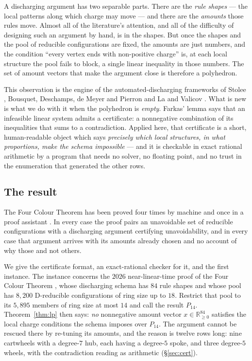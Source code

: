 \documentclass[11pt]{article}
\theoremstyle{definition}
\begin{document}
A discharging argument has two separable parts. There are the \emph{rule shapes}
--- the local patterns along which charge may move --- and there are the
\emph{amounts} those rules move. Almost all of the literature's attention, and
all of the difficulty of designing such an argument by hand, is in the shapes.
But once the shapes and the pool of reducible configurations are fixed, the
amounts are just numbers, and the condition ``every vertex ends with non-positive
charge'' is, at each local structure the pool fails to block, a single linear
inequality in those numbers. The set of amount vectors that make the argument
close is therefore a polyhedron.

This observation is the engine of the automated-discharging frameworks of Stolee
\cite{stolee2014}, Bousquet, Deschamps, de Meyer and Pierron
\cite{bousquet2024square} and La and Valicov \cite{lavalicov2022}. What is new is
what we do with it when the polyhedron is \emph{empty}. Farkas' lemma
\cite{farkas1902} says that an infeasible linear system admits a certificate: a
nonnegative combination of its inequalities that sums to a contradiction. Applied
here, that certificate is a short, human-readable object which says
\emph{precisely which local structures, in what proportions, make the schema
impossible} --- and it is checkable in exact rational arithmetic by a program
that needs no solver, no floating point, and no trust in the enumeration that
generated the other rows.

\subsection{The result}

The Four Colour Theorem has been proved four times by machine
\cite{appel1977every,appel1977every2,rsst1997,steinberger2010,nl4ct2026} and once
in a proof assistant \cite{gonthier2008}. In every case the proof pairs an
unavoidable set of reducible configurations with a discharging argument
certifying unavoidability, and in every case that argument arrives with its
amounts already chosen and no account of why those and not others.

We give the certificate format, an exact-rational checker for it, and the first
instance. The instance concerns the $2026$ near-linear-time proof of the Four
Colour Theorem \cite{nl4ct2026}, whose discharging schema has $84$ rule shapes
and whose pool has $8{,}200$ D-reducible configurations of ring size up to $18$.
Restrict that pool to its $5{,}895$ members of ring size at most $14$ and call the
result $P_{14}$. Theorem~\ref{thm:lp} then says: \emph{no} nonnegative amount
vector $x\in\mathbb{R}^{84}_{\ge0}$ satisfies the local charge conditions the
schema imposes over $P_{14}$. The argument cannot be rescued there by re-tuning
its amounts, and the reason is twelve rows long: nine cartwheels with a
degree-$7$ hub, each having a degree-$5$ spoke, and three degree-$5$ wheels,
with the contradiction reading as arithmetic (\S\ref{sec:cert}).
\end{document}
